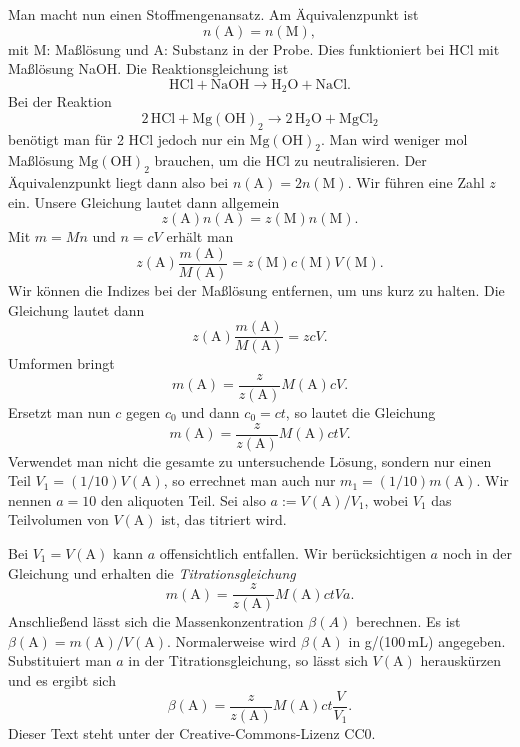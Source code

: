 \documentclass[a4paper,11pt,fleqn,twocolumn]{article}
\begin{document}
Man macht nun einen Stoffmengenansatz. Am Äquivalenzpunkt ist
\begin{equation}
n(\mathrm A)=n(\mathrm M),
\end{equation}
mit M: Maßlösung und A: Substanz in der Probe.
Dies funktioniert bei HCl mit Maßlösung NaOH.
Die Reaktionsgleichung ist
\[\mathrm{HCl + NaOH \longrightarrow H_2O + NaCl}.\]
Bei der Reaktion
\[\mathrm{2\,HCl + Mg(OH)_2 \longrightarrow 2\,H_2O + MgCl_2}\]
benötigt man für 2 HCl jedoch nur ein $\mathrm{Mg(OH)_2}$.
Man wird weniger mol Maßlösung $\mathrm{Mg(OH)_2}$ brauchen,
um die HCl zu neutralisieren. Der Äquivalenzpunkt liegt
dann also bei $n(\mathrm A)=2n(\mathrm M)$. Wir führen eine Zahl
$z$ ein. Unsere Gleichung lautet dann allgemein
\begin{equation}
z(\mathrm A)n(\mathrm A) = z(\mathrm M)n(\mathrm M).
\end{equation}
Mit $m=Mn$ und $n=cV$ erhält man
\begin{equation}
z(\mathrm A)\frac{m(\mathrm A)}{M(\mathrm A)}
= z(\mathrm M)c(\mathrm M)V(\mathrm M).
\end{equation}
Wir können die Indizes bei der Maßlösung entfernen, um
uns kurz zu halten. Die Gleichung lautet dann
\begin{equation}
z(\mathrm A)\frac{m(\mathrm A)}{M(\mathrm A)} = zcV.
\end{equation}
Umformen bringt
\begin{equation}
m(\mathrm A) = \frac{z}{z(\mathrm A)} M(\mathrm A) cV.
\end{equation}
Ersetzt man nun $c$ gegen $c_0$ und dann $c_0=ct$,
so lautet die Gleichung
\begin{equation}
m(\mathrm A) = \frac{z}{z(\mathrm A)} M(\mathrm A) ctV.
\end{equation}
Verwendet man nicht die gesamte zu untersuchende Lösung, sondern
nur einen Teil $V_1 = (1/10)V(\mathrm A)$, so errechnet man auch nur
$m_1 = (1/10)m(\mathrm A)$. Wir nennen $a=10$ den aliquoten Teil.
Sei also $a:=V(\mathrm A)/V_1$, wobei $V_1$ das Teilvolumen von
$V(\mathrm A)$ ist, das titriert wird.

Bei $V_1=V(\mathrm A)$ kann $a$ offensichtlich entfallen.
Wir berücksichtigen $a$ noch in der Gleichung und erhalten
die \emph{Titrationsgleichung}
\begin{equation}
m(\mathrm A) = \frac{z}{z(\mathrm A)} M(\mathrm A)ctVa.
\end{equation}
Anschließend lässt sich die Massenkonzentration $\beta(A)$ berechnen.
Es ist $\beta(\mathrm A) = m(\mathrm A)/V(\mathrm A)$.
Normalerweise wird $\beta(\mathrm A)$ in g/(100\,mL) angegeben.
Substituiert man $a$ in der Titrationsgleichung, so lässt sich
$V(\mathrm A)$ herauskürzen und es ergibt sich
\begin{equation}
\beta(\mathrm A) = \frac{z}{z(\mathrm A)} M(\mathrm A) ct\frac{V}{V_1}.
\end{equation}
{\small Dieser Text steht unter der Creative-Commons-Lizenz CC0.}
\end{document}

